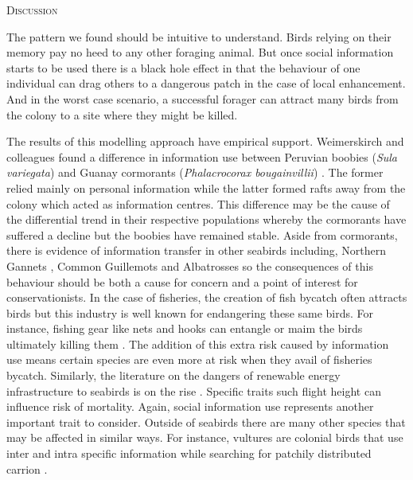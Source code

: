 \documentclass[12pt,letterpaper]{article}
\renewcommand{\section}[1]{%
\bigskip
\begin{center}
\begin{Large}
\normalfont\scshape #1
\medskip
\end{Large}
\end{center}}
\begin{document}
%
%

\section{Discussion}
The pattern we found should be intuitive to understand. Birds relying on their memory pay no heed to any other foraging animal. But once social information starts to be used there is a black hole effect in that the behaviour of one individual can drag others to a dangerous patch in the case of local enhancement. And in the worst case scenario, a successful forager can attract many birds from the colony to a site where they might be killed. 

The results of this modelling approach have empirical support. Weimerskirch and colleagues found a difference in information use between Peruvian boobies (\textit{Sula variegata}) and Guanay cormorants (\textit{Phalacrocorax bougainvillii}) \cite{weimerskirch2010use}. The former relied mainly on personal information while the latter formed rafts away from the colony which acted as information centres. This difference may be the cause of the differential trend in their respective populations whereby the cormorants have suffered a decline but the boobies have remained stable. Aside from cormorants, there is evidence of information transfer in other seabirds including, Northern Gannets \cite{wakefield2013space}, Common Guillemots \cite{burger1997arrival} and Albatrosses \cite{weimerskirch2010use} so the consequences of this behaviour should be both a cause for concern and a point of interest for conservationists. In the case of fisheries, the creation of fish bycatch often attracts birds but this industry is well known for endangering these same birds. For instance, fishing gear like nets and hooks can entangle or maim the birds ultimately killing them \cite{tasker2000impacts}. The addition of this extra risk caused by information use means certain species are even more at risk when they avail of fisheries bycatch. Similarly, the literature on the dangers of renewable energy infrastructure to seabirds is on the rise \cite{furness2013assessing}. Specific traits such flight height can influence risk of mortality. Again, social information use represents another important trait to consider. Outside of seabirds there are many other species that may be affected in similar ways. For instance, vultures are colonial birds that use inter and intra specific information while searching for patchily distributed carrion \cite{KaneVul}. 
\end{document}
